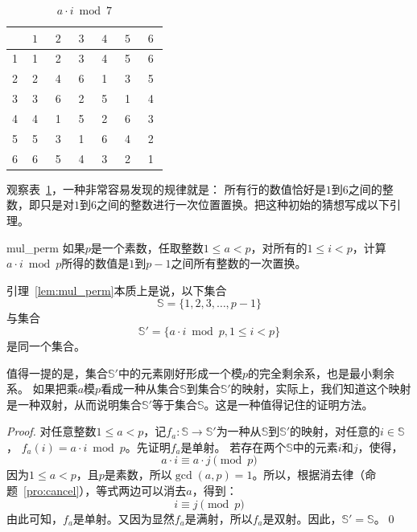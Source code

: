 \begin{table}[htbp]
	\centering
		\begin{tabular}{ | c | c | c | c | c | c | c | }
			\hline
			\diagbox{$a$}{$a\cdot i \;$}{$i \;$}  & $\; 1 \;$ & $\; 2 \;$ & $\; 3 \;$ & $\; 4 \;$ & $\; 5 \;$ & $\; 6 \;$ \\ \hline
			1 & 1 & 2 & 3 & 4 & 5 & 6 \\ \hline
			2 & 2 & 4 & 6 & 1 & 3 & 5 \\ \hline
			3 & 3 & 6 & 2 & 5 & 1 & 4 \\ \hline
			4 & 4 & 1 & 5 & 2 & 6 & 3 \\ \hline
			5 & 5 & 3 & 1 & 6 & 4 & 2 \\ \hline
			6 & 6 & 5 & 4 & 3 & 2 & 1 \\
			\hline
		\end{tabular}
	\centering\caption{$a\cdot i \bmod 7$}
\label{tab:ai_mod_7}
\end{table}

观察表~\ref{tab:ai_mod_7}，一种非常容易发现的规律就是：
所有行的数值恰好是$1$到$6$之间的整数，即只是对$1$到$6$之间的整数进行一次位置置换。把这种初始的猜想写成以下引理。

\begin{lemma}{}{mul_perm}
如果$p$是一个素数，任取整数$1 \leq a < p$，对所有的$1 \leq i < p$，计算$a \cdot i \bmod p$所得的数值是$1$到$p-1$之间所有整数的一次置换。
\end{lemma}

引理~\ref{lem:mul_perm}本质上是说，以下集合
	\[\mathbb{S} = \{1, 2, 3, \ldots, p-1\}\]
与集合
    \[\mathbb{S}'  = \{ a \cdot i \bmod p, 1 \leq i < p \}\]
是同一个集合。

值得一提的是，集合$\mathbb{S}'$中的元素刚好形成一个模$p$的完全剩余系，也是最小剩余系。
如果把乘$a$模$p$看成一种从集合$\mathbb{S}$到集合$\mathbb{S}'$的映射，实际上，我们知道这个映射是一种双射，从而说明集合$\mathbb{S}'$等于集合$\mathbb{S}$。这是一种值得记住的证明方法。

\begin{proof}
对任意整数$1\leq a < p$，记$f_a : \mathbb{S} \rightarrow \mathbb{S}'$为一种从$\mathbb{S}$到$\mathbb{S}'$的映射，对任意的$i \in \mathbb{S}$，
$f_a(i) = a\cdot i \bmod p$。先证明$f_a$是单射。
若存在两个$\mathbb{S}$中的元素$i$和$j$，使得，
	\[a \cdot i \equiv a\cdot j  \pmod{p}\]
因为$1 \leq a < p$，且$p$是素数，所以$\gcd(a, p) =1$。所以，根据消去律（命题~\ref{pro:cancel}），等式两边可以消去$a$，得到：
\[i \equiv j \pmod{p}\]
由此可知，$f_a$是单射。又因为显然$f_a$是满射，所以$f_a$是双射。因此，$\mathbb{S}' = \mathbb{S}$。\qed
\end{proof}

